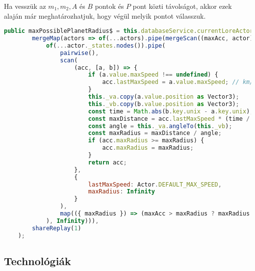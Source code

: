 Ha vesszük az $m_1, m_2, A$ és $B$ pontok és $P$ pont közti távolságot, akkor ezek alaján már meghatározhatjuk, hogy végül melyik pontot válasszuk.




















\begin{lstlisting}[language={JavaScript}]
	public maxPossiblePlanetRadius$ = this.databaseService.currentLoreActors$.pipe(
		mergeMap(actors => of(...actors).pipe(mergeScan((maxAcc, actor) =>
			of(...actor._states.nodes()).pipe(
				pairwise(),
				scan(
					(acc, [a, b]) => {
						if (a.value.maxSpeed !== undefined) {
							acc.lastMaxSpeed = a.value.maxSpeed; // km/h
						}
						this._va.copy(a.value.position as Vector3);
						this._vb.copy(b.value.position as Vector3);
						const time = Math.abs(b.key.unix - a.key.unix); // s
						const maxDistance = acc.lastMaxSpeed * (time / 3600);
						const angle = this._va.angleTo(this._vb);
						const maxRadius = maxDistance / angle;
						if (acc.maxRadius >= maxRadius) {
							acc.maxRadius = maxRadius;
						}
						return acc;
					},
					{
						lastMaxSpeed: Actor.DEFAULT_MAX_SPEED,
						maxRadius: Infinity
					}
				),
				map(({ maxRadius }) => (maxAcc > maxRadius ? maxRadius : maxAcc))
			), Infinity))),
		shareReplay(1)
	);

\end{lstlisting}






























\subsection{Technológiák}

